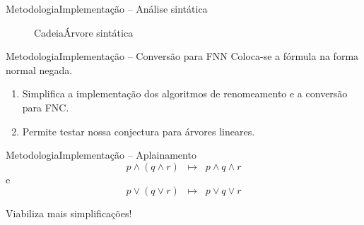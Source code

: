 \begin{frame}{Metodologia}{Implementação -- Análise sintática}
	\begin{figure}
		\centering
		
		\raisebox{3.5\height}{$(p \leftrightarrow p) \leftrightarrow (p \leftrightarrow p)$}
		\hspace{1cm}
		\raisebox{7\height}{$\longmapsto$}
		\hspace{1cm}
		
		\hspace{.5cm}Cadeia\hspace{4.6cm}Árvore sintática
	\end{figure}
\end{frame}

\begin{frame}{Metodologia}{Implementação -- Conversão para FNN}
	Coloca-se a fórmula na forma normal negada.
	\begin{enumerate}
		\pause\item Simplifica a implementação dos algoritmos de renomeamento e a conversão para FNC.
		\pause\item Permite testar nossa conjectura para árvores lineares.
	\end{enumerate}
\end{frame}

\begin{frame}{Metodologia}{Implementação -- Aplainamento}
	$$p \wedge (q \wedge r) \;\; \longmapsto \;\; p \wedge q \wedge r$$ e $$p \vee (q \vee r) \;\; \longmapsto \;\; p \vee q \vee r$$
	
	\pause Viabiliza mais simplificações!
\end{frame}

